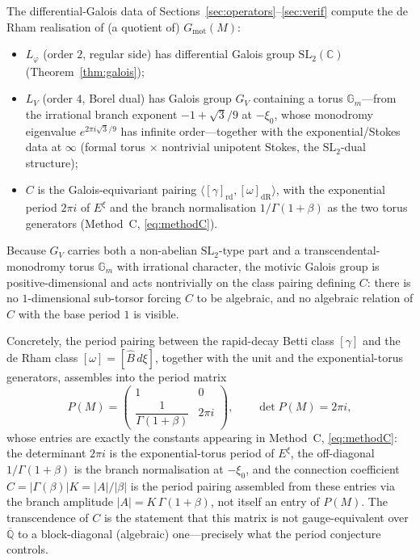 \documentclass[11pt,reqno]{amsart}
\renewcommand{\_}{\vquadorigunderscore\allowbreak}
\theoremstyle{plain}
\theoremstyle{definition}
\newcommand{\Bhat}{\widehat{B}}
\newcommand{\Lphi}{L_{\varphi}}
\newcommand{\LV}{L_{V}}
\newcommand{\Qbar}{\overline{\mathbb{Q}}}
\newcommand{\xizero}{\xi_0}
\newcommand{\SL}{\mathrm{SL}}
\newcommand{\Gm}{\mathbb{G}_m}
\providecommand{\C}{}\renewcommand{\C}{C}
\begin{document}
The differential-Galois data of Sections~\ref{sec:operators}--\ref{sec:verif} compute the de Rham
realisation of (a quotient of) $G_{\mathrm{mot}}(M)$:
\begin{itemize}[leftmargin=1.4em,itemsep=2pt]
  \item $\Lphi$ (order $2$, regular side) has differential Galois group $\SL_2(\mathbb{C})$
        (Theorem~\ref{thm:galois});
  \item $\LV$ (order $4$, Borel dual) has Galois group $G_V$ containing a torus $\Gm$---from the
        irrational branch exponent $-1+\sqrt3/9$ at $-\xizero$, whose monodromy eigenvalue
        $e^{2\pi i\sqrt3/9}$ has infinite order---together with the exponential/Stokes data at
        $\infty$ (formal torus $\times$ nontrivial unipotent Stokes, the $\SL_2$-dual structure);
  \item $\C$ is the Galois-equivariant pairing $\langle[\gamma]_{\mathrm{rd}},[\omega]_{\mathrm{dR}}\rangle$,
        with the exponential period $2\pi i$ of $E^{\xi}$ and the branch normalisation
        $1/\Gamma(1+\beta)$ as the two torus generators (Method~C, \eqref{eq:methodC}).
\end{itemize}
Because $G_V$ carries both a non-abelian $\SL_2$-type part and a transcendental-monodromy torus
$\Gm$ with irrational character, the motivic Galois group is positive-dimensional and acts
nontrivially on the class pairing defining $\C$: there is no $1$-dimensional sub-torsor forcing $\C$
to be algebraic, and no algebraic relation of $\C$ with the base period $1$ is visible.

Concretely, the period pairing between the rapid-decay Betti class $[\gamma]$ and the de Rham class
$[\omega]=[\Bhat\,d\xi]$, together with the unit and the exponential-torus generators, assembles
into the period matrix
\begin{equation}\label{eq:periodmatrix}
  P(M)=\begin{pmatrix} 1 & 0\\[2pt] \dfrac{1}{\Gamma(1+\beta)} & 2\pi i\end{pmatrix},
  \qquad \det P(M)=2\pi i,
\end{equation}
whose entries are exactly the constants appearing in Method~C, \eqref{eq:methodC}: the determinant
$2\pi i$ is the exponential-torus period of $E^{\xi}$, the off-diagonal $1/\Gamma(1+\beta)$ is the
branch normalisation at $-\xizero$, and the connection coefficient
$\C=\lvert\Gamma(\beta)\rvert K=\lvert A\rvert/\lvert\beta\rvert$ is the period pairing assembled
from these entries via the branch amplitude $\lvert A\rvert=K\,\Gamma(1+\beta)$, not itself an
entry of $P(M)$. The transcendence
of $\C$ is the statement that this matrix is not gauge-equivalent over $\Qbar$ to a block-diagonal
(algebraic) one---precisely what the period conjecture controls.
\end{document}
